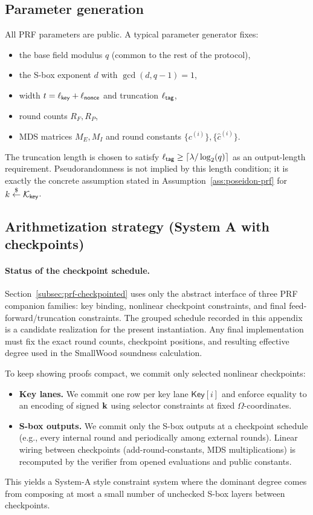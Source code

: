 \subsection{Parameter generation}
All PRF parameters are public. A typical parameter generator fixes:
\begin{itemize}[leftmargin=1.25em]
  \item the base field modulus \(q\) (common to the rest of the protocol),
  \item the S-box exponent \(d\) with \(\gcd(d,q-1)=1\),
  \item width \(t=\ell_{\mathsf{key}}+\ell_{\mathsf{nonce}}\) and truncation \(\ell_{\mathsf{tag}}\),
  \item round counts \(R_F,R_P\),
  \item MDS matrices \(M_E,M_I\) and round constants \(\{c^{(i)}\},\{\hat c^{(i)}\}\).
\end{itemize}
The truncation length is chosen to satisfy
\(\ell_{\mathsf{tag}}\ge \lceil \lambda/\log_2(q)\rceil\) as an output-length requirement.  Pseudorandomness is
not implied by this length condition; it is exactly the concrete assumption stated in
Assumption~\ref{ass:poseidon-prf} for \(k\overset{\$}{\leftarrow}\mathcal K_{\mathsf{key}}\).

\subsection{Arithmetization strategy (System A with checkpoints)}
\paragraph{Status of the checkpoint schedule.}
Section~\ref{subsec:prf-checkpointed} uses only the abstract interface of three PRF companion families: key binding,
nonlinear checkpoint constraints, and final feed-forward/truncation constraints. The grouped schedule recorded in this
appendix is a candidate realization for the present instantiation.  Any final implementation must fix the exact
round counts, checkpoint positions, and resulting effective degree used in the SmallWood soundness calculation.

To keep showing proofs compact, we commit only selected nonlinear checkpoints:
\begin{itemize}[leftmargin=1.25em]
  \item \textbf{Key lanes.} We commit one row per key lane \(\mathsf{Key}[i]\) and enforce equality to an encoding of
  signed \(\mathbf{k}\) using selector constraints at fixed \(\Omega\)-coordinates.
  \item \textbf{S-box outputs.} We commit only the S-box outputs at a checkpoint schedule (e.g., every internal round and
  periodically among external rounds). Linear wiring between checkpoints (add-round-constants, MDS multiplications) is
  recomputed by the verifier from opened evaluations and public constants.
\end{itemize}
This yields a System-A style constraint system where the dominant degree comes from composing at most a small number of
unchecked S-box layers between checkpoints.
